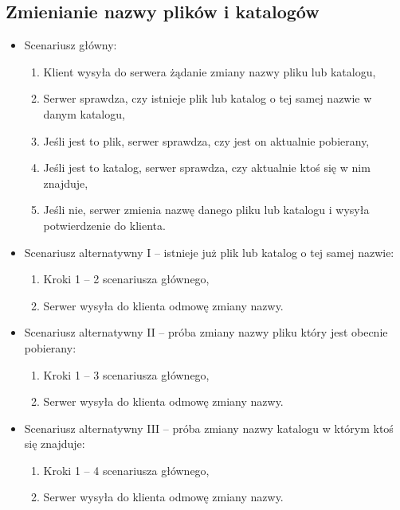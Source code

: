 \documentclass[10pt,a4paper]{article}
\begin{document}
\subsection{Zmienianie nazwy plików i katalogów}
\begin{itemize}
    \item Scenariusz główny:
    \begin{enumerate}
        \item Klient wysyła do serwera żądanie zmiany nazwy pliku lub katalogu,
        \item Serwer sprawdza, czy istnieje plik lub katalog o tej samej nazwie w danym katalogu,
        \item Jeśli jest to plik, serwer sprawdza, czy jest on aktualnie pobierany,
        \item Jeśli jest to katalog, serwer sprawdza, czy aktualnie ktoś się w nim znajduje,
        \item Jeśli nie, serwer zmienia nazwę danego pliku lub katalogu i wysyła potwierdzenie do klienta.
    \end{enumerate}

    \item Scenariusz alternatywny I -- istnieje już plik lub katalog o tej samej nazwie:
    \begin{enumerate}
        \item Kroki 1 -- 2 scenariusza głównego,
        \item Serwer wysyła do klienta odmowę zmiany nazwy.
    \end{enumerate}

    \item Scenariusz alternatywny II -- próba zmiany nazwy pliku który jest obecnie pobierany:
    \begin{enumerate}
        \item Kroki 1 -- 3 scenariusza głównego,
        \item Serwer wysyła do klienta odmowę zmiany nazwy.
    \end{enumerate}

    \item Scenariusz alternatywny III -- próba zmiany nazwy katalogu w którym ktoś się znajduje:
    \begin{enumerate}
        \item Kroki 1 -- 4 scenariusza głównego,
        \item Serwer wysyła do klienta odmowę zmiany nazwy.
    \end{enumerate}
\end{itemize}
\end{document}

